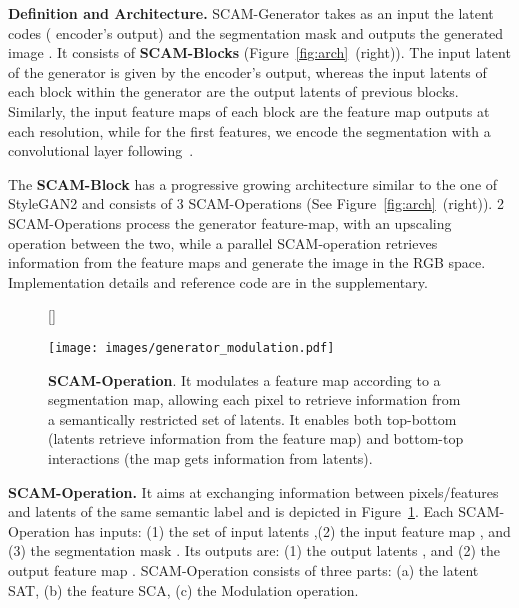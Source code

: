 \documentclass[runningheads]{llncs}
\begin{document}
\noindent \textbf{Definition and Architecture.} 
SCAM-Generator takes as an input the latent codes  ( encoder's output) and the segmentation mask  and outputs the generated image . 
It consists of  \textbf{SCAM-Blocks} (Figure~\ref{fig:arch}~(right)). 
The input latent of the generator is given by the encoder's output, whereas the input latents of each block within the generator are the output latents of previous blocks. 
Similarly, the input feature maps of each block are the feature map outputs at each resolution, while for the first features, we encode the segmentation with a convolutional layer following~\cite{park2019semantic,Zhu_2020}.

\noindent The \textbf{SCAM-Block} has a progressive growing architecture similar to the one of StyleGAN2 \cite{karras2020analyzing} and consists of 3 SCAM-Operations (See Figure~\ref{fig:arch}~(right)). 2 SCAM-Operations process the generator feature-map, with an upscaling operation between the two, while a parallel SCAM-operation retrieves information from the feature maps and generate the image in the RGB space. Implementation details and reference code are in the supplementary.












\begin{figure}[b]
[\FBwidth]
{\caption{\small{\textbf{SCAM-Operation}. 
    It modulates a feature map according to a segmentation map, allowing each pixel to retrieve information from a semantically restricted set of latents. It enables both top-bottom (latents retrieve information from the feature map) and bottom-top interactions (the map gets information from latents).
    }}}
{\texttt{[image: images/generator\_modulation.pdf]}
\label{fig:scam}}
\end{figure}


\noindent \textbf{SCAM-Operation.} It aims at exchanging information between pixels/features and latents of the same semantic label and is depicted in Figure~\ref{fig:scam}. 
Each SCAM-Operation has inputs: (1) the set of input latents ,(2) the input feature map  , and (3) the segmentation mask . 
Its outputs are: (1) the output latents , and (2) the output feature map . 
SCAM-Operation consists of three parts: (a) the latent SAT, (b) the feature SCA, (c) the Modulation operation.
\end{document}
